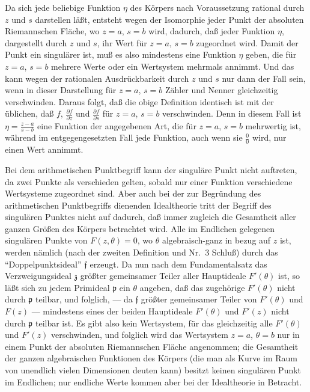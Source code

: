 \documentclass[12pt,a4paper]{article}
\begin{document}
Da sich jede beliebige Funktion $\eta$ des K\"orpers nach Voraussetzung rational durch $z$ und $s$ darstellen l\"a\ss{}t, entsteht wegen der Isomorphie jeder Punkt der absoluten Riemannschen Fl\"ache, wo $z=a$, $s=b$ wird, dadurch, da\ss{} jeder Funktion $\eta$, dargestellt durch $z$ und $s$, ihr Wert f\"ur $z=a$, $s=b$ zugeordnet wird. Damit der Punkt ein singul\"arer ist, mu\ss{} es also mindestens eine Funktion $\eta$ geben, die f\"ur $z=a$, $s=b$ mehrere Werte oder ein Wertsystem mehrmals annimmt. Und das kann wegen der rationalen Ausdr\"uckbarkeit durch $z$ und $s$ nur dann der Fall sein, wenn in dieser Darstellung f\"ur $z=a$, $s=b$ Z\"ahler und Nenner gleichzeitig verschwinden. Daraus folgt, da\ss{} die obige Definition identisch ist mit der \"ublichen, da\ss{} $f$, $\frac{\partial f}{\partial z}$ und $\frac{\partial f}{\partial s}$ f\"ur $z=a$, $s=b$ verschwinden. Denn in diesem Fall ist $\eta=\frac{z-a}{s-b}$ eine Funktion der angegebenen Art, die f\"ur $z=a$, $s=b$ mehrwertig ist, w\"ahrend im entgegengesetzten Fall jede Funktion, auch wenn sie $\frac{0}{0}$ wird, nur einen Wert annimmt.

Bei dem arithmetischen Punktbegriff kann der singul\"are Punkt nicht auftreten, da zwei Punkte als verschieden gelten, sobald nur einer Funktion verschiedene Wertsysteme zugeordnet sind. Aber auch bei der zur Begr\"undung des arithmetischen Punktbegriffs dienenden Idealtheorie tritt der Begriff des singul\"aren Punktes nicht auf dadurch, da\ss{} immer zugleich die Gesamtheit aller ganzen Gr\"o\ss{}en des K\"orpers betrachtet wird. Alle im Endlichen gelegenen singul\"aren Punkte von $F(z,\theta)=0$, wo $\theta$ algebraisch-ganz in bezug auf $z$ ist, werden n\"amlich (nach der zweiten Definition und Nr.\ 3 Schlu\ss{}) durch das ``Doppelpunktsideal'' $\mathfrak{f}$ erzeugt. Da nun nach dem Fundamentalsatz das Verzweigungsideal $\mathfrak{z}$ gr\"o\ss{}ter gemeinsamer Teiler aller Hauptideale $F'(\theta)$ ist, so l\"a\ss{}t sich zu jedem Primideal $\mathfrak{p}$ ein $\theta$ angeben, da\ss{} das zugeh\"orige $F'(\theta)$ nicht durch $\mathfrak{p}$ teilbar, und folglich, --- da $\mathfrak{f}$ gr\"o\ss{}ter gemeinsamer Teiler von $F'(\theta)$ und $F(z)$ --- mindestens eines der beiden Hauptideale $F'(\theta)$ und $F'(z)$ nicht durch $\mathfrak{p}$ teilbar ist. Es gibt also kein Wertsystem, f\"ur das gleichzeitig alle $F'(\theta)$ und $F'(z)$ verschwinden, und folglich wird das Wertsystem $z=a$, $\theta=b$ nur in einem Punkt der absoluten Riemannschen Fl\"ache angenommen; die Gesamtheit der ganzen algebraischen Funktionen des K\"orpers (die man als Kurve im Raum von unendlich vielen Dimensionen deuten kann) besitzt keinen singul\"aren Punkt im Endlichen; nur endliche Werte kommen aber bei der Idealtheorie in Betracht.
\end{document}
